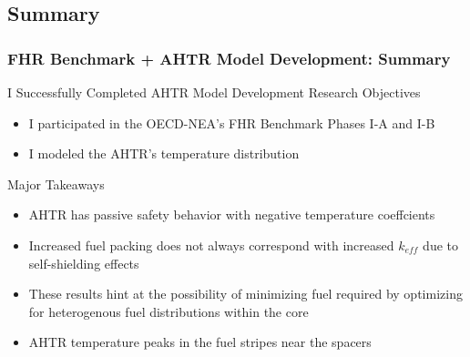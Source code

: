 \subsection{Summary}
\begin{frame}
    \frametitle{FHR Benchmark + AHTR Model Development: Summary}
    \begin{block}{I Successfully Completed AHTR Model Development Research Objectives}
        \begin{itemize}
            \item I participated in the OECD-NEA's FHR Benchmark Phases I-A and I-B
            \item I modeled the \gls{AHTR}'s temperature distribution 
        \end{itemize}
    \end{block}
    \begin{block}{Major Takeaways}
        \begin{itemize}
            \item AHTR has passive safety behavior with negative temperature coeffcients
            \item Increased fuel packing does not always correspond with increased 
            $k_{eff}$ due to self-shielding effects 
            \item These results hint at the possibility of minimizing fuel required by 
            optimizing for heterogenous fuel distributions within the core
            \item AHTR temperature peaks in the fuel stripes near the spacers 
        \end{itemize}
    \end{block}
\end{frame}
